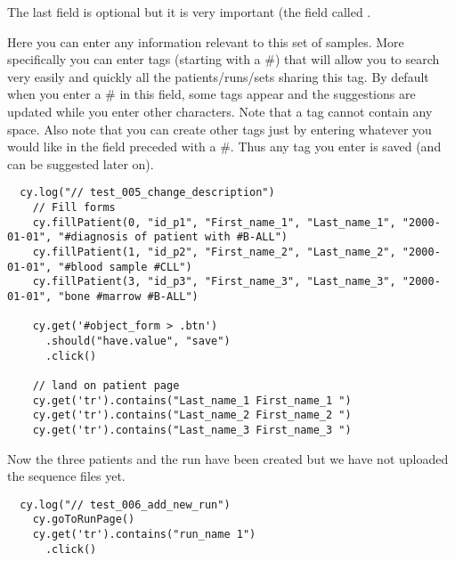 The last field is optional but it is very important (the field called
.

Here you can enter any information relevant to this set of samples.
More specifically you can enter tags (starting with a \#) that will allow
you to search very easily and quickly all the patients/runs/sets sharing
this tag.
By default when you enter a \# in this field, some tags appear and the
suggestions are  updated while you enter other characters.
Note that a tag cannot contain any space.
Also note that you can create other tags just by entering whatever you would
like in the field preceded with a \#. Thus any tag you enter is saved (and
can be suggested later on).

\begin{verbatim}
  cy.log("// test_005_change_description")
    // Fill forms
    cy.fillPatient(0, "id_p1", "First_name_1", "Last_name_1", "2000-01-01", "#diagnosis of patient with #B-ALL")
    cy.fillPatient(1, "id_p2", "First_name_2", "Last_name_2", "2000-01-01", "#blood sample #CLL")
    cy.fillPatient(3, "id_p3", "First_name_3", "Last_name_3", "2000-01-01", "bone #marrow #B-ALL")

    cy.get('#object_form > .btn')
      .should("have.value", "save")
      .click()

    // land on patient page
    cy.get('tr').contains("Last_name_1 First_name_1 ")
    cy.get('tr').contains("Last_name_2 First_name_2 ")
    cy.get('tr').contains("Last_name_3 First_name_3 ")

\end{verbatim}


Now the three patients and the run have been created but we have not uploaded
the sequence files yet.

\begin{verbatim}
  cy.log("// test_006_add_new_run")
    cy.goToRunPage()
    cy.get('tr').contains("run_name 1")
      .click()

\end{verbatim}


